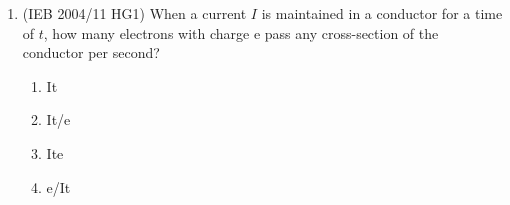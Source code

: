 \begin{enumerate}[noitemsep, label=\textbf{\arabic*}. ]
\begin{enumerate}[noitemsep, label=\textbf{\alph*}. ]
{\begin{center}
\begin{xtabular*}{\mytablewidth}[t]{|p{10\mystarwidth}|p{10\mystarwidth}|p{10\mystarwidth}|}
        increases%
     \tabularnewline{}
    
    
        (d) &
    
    
        increases &
    
    
        decreases%
     \tabularnewline{}
    \end{xtabular*}
      \end{center}
    \begin{center}{\small\bfseries Table 16.4}\end{center}
    
    \addtocounter{footnote}{-0}
    
        }%
      
    \par
  \end{enumerate}
                  \label{m38776*uid104}\item (IEB 2004/11 HG1) When a current \begin{math}I\end{math} is maintained in a conductor for a time of \begin{math}t\end{math}, how many electrons with charge e pass any cross-section of the conductor per second?
\label{m38776*id68784}\begin{enumerate}[noitemsep, label=\textbf{\alph*}. ] 
            \label{m38776*uid105}\item It
\label{m38776*uid106}\item It/e
\label{m38776*uid107}\item Ite
\label{m38776*uid108}\item e/It
\end{enumerate}
                  \end{enumerate}
        
